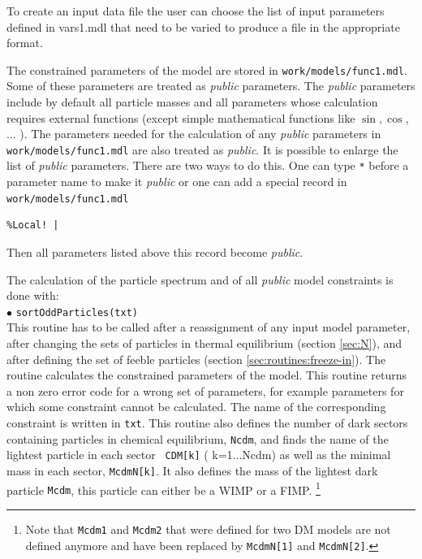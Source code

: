 \documentclass[12pt,a4paper]{article}
\begin{document}
 To create an input  data file the user can  choose the list of input parameters defined in vars1.mdl that need to be varied to produce a file in the appropriate format. 


The constrained parameters of the model are stored in \verb|work/models/func1.mdl|. Some of
these parameters are treated as {\it public} parameters. The {\it public} parameters include 
by default all particle masses 
and all parameters  whose calculation requires external functions (except simple
mathematical functions like $\sin,\cos$, ... ). The parameters needed for the calculation of any 
{\it public} parameters in  \verb|work/models/func1.mdl|
are also treated as {\it public}. 
It is possible to enlarge the list of {\it public} parameters. There are two ways to do this. 
One can type \verb|*| before a parameter name to make it {\it public} or one 
can add a  special record in \verb|work/models/func1.mdl|
\begin{verbatim}
%Local! |   
\end{verbatim}
Then all parameters listed above this record  become {\it public}. 


The calculation of the particle spectrum and of all  {\it public} model constraints 
is  done with:\\[2mm]
 $\bullet$ \verb|sortOddParticles(txt)|\\
This routine has to be called after a reassignment of any input model parameter,
after changing the  sets of particles in  thermal equilibrium (section \ref{sec:N}), and after defining the set of
feeble particles (section \ref{sec:routines:freeze-in}). The routine calculates the
constrained parameters of the model. This routine returns a non zero error code for a
wrong set of parameters, for example parameters  for which some
constraint cannot be calculated. The name of the corresponding constraint is
written in \verb|txt|. 
This routine also  defines the number of dark  sectors containing particles in chemical equilibrium, 
{\tt Ncdm},  and finds the  name  of the lightest particle in each sector {\tt
CDM[k]} ( k=1...Ncdm) as well as  the minimal mass  in each sector, {\tt McdmN[k]}. It also defines  the
 mass of the lightest dark particle {\tt Mcdm}, this particle can either be a WIMP or a FIMP. {\footnote{Note that {\tt Mcdm1} and {\tt Mcdm2} that were defined for two DM models are not defined anymore and have been replaced by {\tt McdmN[1]} and  {\tt McdmN[2]}. }}
  
\end{document}
